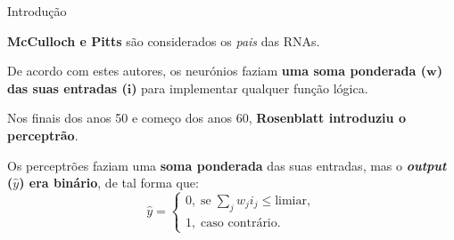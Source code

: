 \begin{frame}{Introdução \cont}
		
	\textbf{McCulloch e Pitts} são considerados os \textit{pais} das RNAs. 
		    
	De acordo com estes autores, os neurónios faziam \textbf{uma soma ponderada ($\mathbf{w}$) das suas entradas ($\mathbf{i}$)} para implementar qualquer função lógica.
		   
	\pauseskip
		
	Nos finais dos anos 50 e começo dos anos 60, \textbf{Rosenblatt introduziu o perceptrão}.
		    
	Os perceptrões faziam uma \textbf{soma ponderada} das suas entradas, mas o \textbf{\textit{output} ($\hat{y}$) era binário}, de tal forma que:
	\begin{equation}
		\hat{y} = \begin{cases}
		0, \; \text{se} \; \sum_j w_j i_j \leq \text{limiar}, \\
		1, \; \text{caso contrário}.
		\end{cases}
	\end{equation}
		    
		    
\end{frame}

